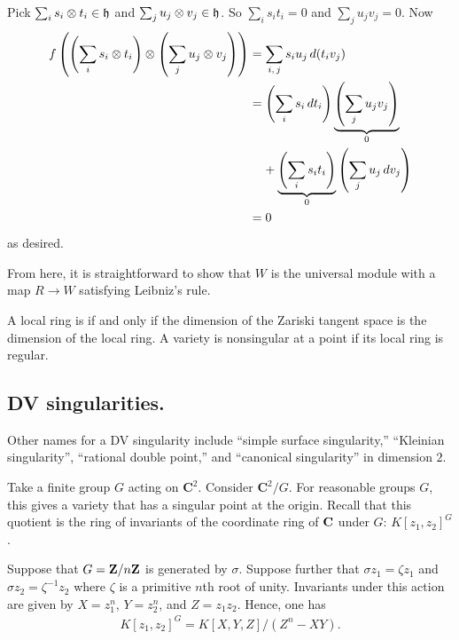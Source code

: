 \documentclass [11 pt, oneside] {article}
\begin{document}
Pick $\sum_{i}^{} s_i\otimes t_i\in \mathfrak{h}$ and $\sum_{j}^{} u_j\otimes v_j\in \mathfrak{h}$. So $\sum_{i}^{} s_it_i=0$ and $\sum_{j}^{} u_jv_j=0$. Now
\begin{align*}
	f \left( \left( \sum_{i}^{} s_i\otimes t_i \right)\otimes \left( \sum_{j}^{} u_j\otimes v_j \right)  \right)&= \sum_{i,\,j}^{} s_iu_j\, d(t_iv_j) \\
														   &= \left( \sum_{i}^{} s_i\, dt_i \right) \underbrace{\left( \sum_{j}^{} u_jv_j \right)}_{0} \\ &\phantom{=}\ + \underbrace{\left( \sum_{i}^{} s_it_i \right)}_{0} \left( \sum_{j}^{} u_j\, dv_j \right) \\
														   &=0
\end{align*}
as desired.

From here, it is straightforward to show that $W$ is the universal module with a map $R\longrightarrow W$ satisfying Leibniz's rule.


\begin{remark}
	A local ring is  if and only if the dimension of the Zariski tangent space is the dimension of the local ring. A variety is nonsingular at a point if its local ring is regular.
\end{remark}

\subsection{DV singularities.}
Other names for a DV singularity include ``simple surface singularity,'' ``Kleinian singularity'', ``rational double point,'' and ``canonical singularity'' in dimension $2$.

Take a finite group $G$ acting on $\mathbf{C}^2$. Consider $\mathbf{C}^2/G$. For reasonable groups $G$, this gives a variety that has a singular point at the origin. Recall that this quotient is the ring of invariants of the coordinate ring of $\mathbf C$ under $G$: $K[z_1,z_2]^G$. 

Suppose that $G=\mathbf Z / n\mathbf Z$ is generated by $\sigma$. Suppose further that $\sigma z_1 = \zeta z_1$ and $\sigma z_2 =\zeta^{-1}z_2$ where $\zeta$ is a primitive $n$th root of unity. Invariants under this action are given by $X =z_1^n$, $Y=z_2^n$, and $Z=z_1z_2$. Hence, one has
\begin{align*}
	K[z_1,z_2]^G = K[X,Y,Z] / (Z^n- XY).
\end{align*}
\end{document}

